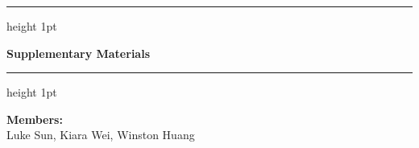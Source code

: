 \documentclass[12pt, a4paper]{article}
\begin{document}
\begin{titlepage}
    \centering
    \vspace*{2cm} %
    
    \hrule height 1pt
    \vspace{0.6cm}
    
    {\Huge \bfseries Supplementary Materials} \\
    \vspace{0.6cm}
    
    \hrule height 1pt
    
    \vspace{4cm} %
    
    {\large \bfseries Members:} \\[0.4cm]
    {\large Luke Sun, Kiara Wei, Winston Huang}
    
\end{titlepage}
\end{document}
